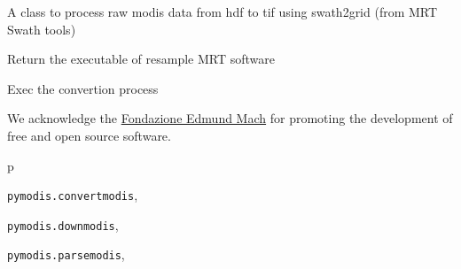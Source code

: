 \documentclass[a4paper,11pt,oneside]{sphinxmanual}
\begin{document}
\begin{fulllineitems}
\label{pymodis/pymodis:pymodis.convertmodis.processModis}
A class to process raw modis data from hdf to tif using swath2grid (from MRT Swath tools)

\begin{fulllineitems}
\label{pymodis/pymodis:pymodis.convertmodis.processModis.executable}
Return the executable of resample MRT software

\end{fulllineitems}


\begin{fulllineitems}
\label{pymodis/pymodis:pymodis.convertmodis.processModis.run}
Exec the convertion process

\end{fulllineitems}


\end{fulllineitems}


We acknowledge the \href{http://www.fmach.it}{Fondazione Edmund Mach} for promoting the development of
free and open source software.


\renewcommand{\indexname}{Python Module Index}
\begin{theindex}
\def\bigletter#1{{\Large\sffamily#1}\nopagebreak\vspace{1mm}}
\bigletter{p}
\item {\texttt{pymodis.convertmodis}}, \pageref{pymodis/pymodis:module-pymodis.convertmodis}
\item {\texttt{pymodis.downmodis}}, \pageref{pymodis/pymodis:module-pymodis.downmodis}
\item {\texttt{pymodis.parsemodis}}, \pageref{pymodis/pymodis:module-pymodis.parsemodis}
\end{theindex}

\renewcommand{\indexname}{Index}
\printindex
\end{document}
